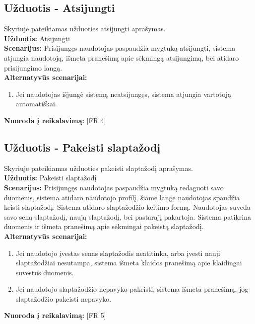 \documentclass{VUMIFPSkursinis}
\begin{document}
	\subsection{Užduotis - Atsijungti}
	Skyriuje pateikiamas užduoties atsijungti aprašymas.\\
	\textbf{Užduotis:}  Atsijungti \\
	\textbf{Scenarijus:} Prisijungęs naudotojas paspaudžia mygtuką atsijungti, sistema atjungia naudotoją, išmeta pranešimą apie sėkmingą atsijungimą, bei atidaro prisijungimo langą. \\
	\textbf{Alternatyvūs scenarijai:}
	\begin{enumerate}
		\item Jei naudotojas išjungė sistemą neatsijungęs, sistema atjungia vartotoją automatiškai.
	\end{enumerate}
	\textbf{Nuoroda į reikalavimą: } [FR 4]

	\subsection{Užduotis - Pakeisti slaptažodį}
	Skyriuje pateikiamas užduoties pakeisti slaptažodį aprašymas.\\
	\textbf{Užduotis:}  Pakeisti slaptažodį \\
	\textbf{Scenarijus:} Prisijungęs naudotojas paspaudžia mygtuką redaguoti savo duomenis, sistema atidaro naudotojo profilį, šiame lange naudotojas spaudžia keisti slaptažodį. Sistema atidaro slaptažodžio keitimo formą. Naudotojas suveda savo seną slaptažodį, naują slaptažodį, bei pastarąjį pakartoja. Sistema patikrina duomenis ir išmeta pranešimą apie sėkmingai pakeistą slaptažodį. \\
	\textbf{Alternatyvūs scenarijai:}
	\begin{enumerate}
		\item Jei naudotojo įvestas senas slaptažodis neatitinka, arba įvesti nauji slaptažodžiai nesutampa, sistema išmeta klaidos pranešimą apie klaidingai suvestus duomenis.
		\item Jei naudotojo slaptažodžio nepavyko pakeisti, sistema išmeta pranešimą, jog slaptažodžio pakeisti nepavyko.
	\end{enumerate}
	\textbf{Nuoroda į reikalavimą: } [FR 5]
\end{document}

